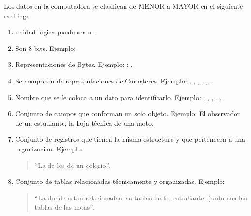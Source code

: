 \documentclass[letterpaper,10pt,spanish]{sphinxmanual}
\begin{document}
\sphinxAtStartPar
Los datos en la computadora se clasifican de MENOR a MAYOR en el siguiente ranking:
\begin{enumerate}
%
\item {} 
\sphinxAtStartPar
{} unidad lógica puede ser  o .

\item {} 
\sphinxAtStartPar
{} Son 8 bits. Ejemplo: 

\item {} 
\sphinxAtStartPar
{} Representaciones de Bytes. Ejemplo: : ,  

\item {} 
\sphinxAtStartPar
{} Se componen de representaciones de Caracteres. Ejemplo: , , ,  , , ,

\item {} 
\sphinxAtStartPar
{} Nombre que se le coloca a un dato para identificarlo. Ejemplo: , , , , , 

\item {} 
\sphinxAtStartPar
{} Conjunto de campos que conforman un solo objeto. Ejemplo: El observador de un estudiante, la hoja técnica de una moto.

\item {} 
\sphinxAtStartPar
{} Conjunto de registros que tienen la misma estructura y que pertenecen a una organización. Ejemplo:
\begin{quote}

\sphinxAtStartPar
“La  de los  de un colegio”.
\end{quote}

\item {} 
\sphinxAtStartPar
{} Conjunto de tablas relacionadas técnicamente y organizadas. Ejemplo:
\begin{quote}

\sphinxAtStartPar
“La  donde están relacionadas las tablas de los estudiantes junto con las tablas de las notas”.
\end{quote}

\end{enumerate}
\end{document}
